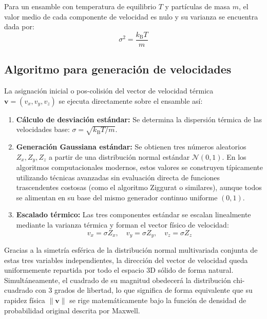 \documentclass[11pt]{article}
\begin{document}
Para un ensamble con temperatura de equilibrio $T$ y partículas de masa $m$, el valor medio de cada componente de velocidad es nulo y su varianza se encuentra dada por:
\begin{equation}
  \sigma^2 = \frac{k_{\mathrm B}T}{m}
\end{equation}

\subsection{Algoritmo para generación de velocidades}

La asignación inicial o pos-colisión del vector de velocidad térmica $\mathbf{v} = (v_x, v_y, v_z)$ se ejecuta directamente sobre el ensamble así:

\begin{enumerate}
    \item \textbf{Cálculo de desviación estándar:} Se determina la dispersión térmica de las velocidades base: $\sigma = \sqrt{k_{\mathrm B} T / m}$.
    \item \textbf{Generación Gaussiana estándar:} Se obtienen tres números aleatorios $Z_x, Z_y, Z_z$ a partir de una distribución normal estándar $\mathcal{N}(0, 1)$. En los algoritmos computacionales modernos, estos valores se construyen típicamente utilizando técnicas avanzadas sin evaluación directa de funciones trascendentes costosas (como el algoritmo Ziggurat o similares), aunque todos se alimentan en su base del mismo generador continuo uniforme $(0,1)$.
    \item \textbf{Escalado térmico:} Las tres componentes estándar se escalan linealmente mediante la varianza térmica y forman el vector físico de velocidad:
    \begin{equation}
        v_x = \sigma Z_x, \quad v_y = \sigma Z_y, \quad v_z = \sigma Z_z
    \end{equation}
\end{enumerate}

Gracias a la simetría esférica de la distribución normal multivariada conjunta de estas tres variables independientes, la dirección del vector de velocidad queda uniformemente repartida por todo el espacio 3D sólido de forma natural. Simultáneamente, el cuadrado de su magnitud obedecerá la distribución chi-cuadrado con 3 grados de libertad, lo que significa de forma equivalente que su rapidez física $\lVert\mathbf{v}\rVert$ se rige matemáticamente bajo la función de densidad de probabilidad original descrita por Maxwell.
\end{document}
